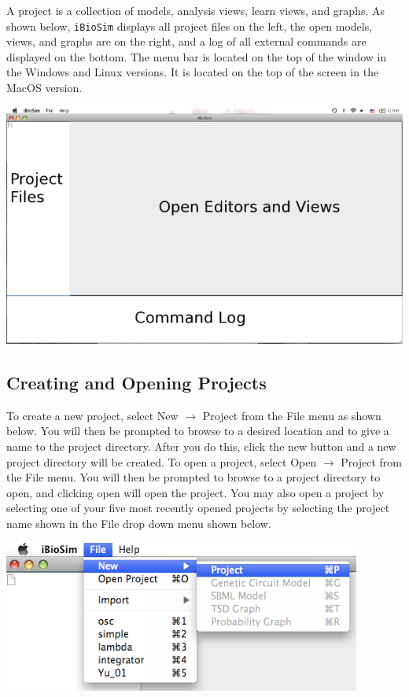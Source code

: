 \documentclass[titlepage,11pt]{article}
\begin{document}
\noindent
A project is a collection of models, analysis views, learn
views, and graphs.  As shown below, {\tt iBioSim} displays all project
files on the left, the open models, views, and graphs are on the
right, and a log of all external commands are displayed on the bottom.
The menu bar is located on the top of the window in the Windows and
Linux versions.  It is located on the top of the screen in the MacOS version.
\begin{center}
\includegraphics[height=80mm]{screenshots/iBioSim}
\end{center}

\subsection{Creating and Opening Projects}

\noindent
To create a new project, select New $\rightarrow$ Project from the File
menu as shown below. You will then be prompted to browse to a desired location
and to give a name to the project directory. After you do this,
click the new button and a new project directory will be created.
To open a project, select Open $\rightarrow$ Project from the File menu.
You will then be prompted to browse to a project directory to
open, and clicking open will open the project. You may also open
a project by selecting one of your five most recently opened
projects by selecting the project name shown in the File drop
down menu shown below. 
\begin{center}
\includegraphics[height=50mm]{screenshots/project}
\end{center}
\end{document}
